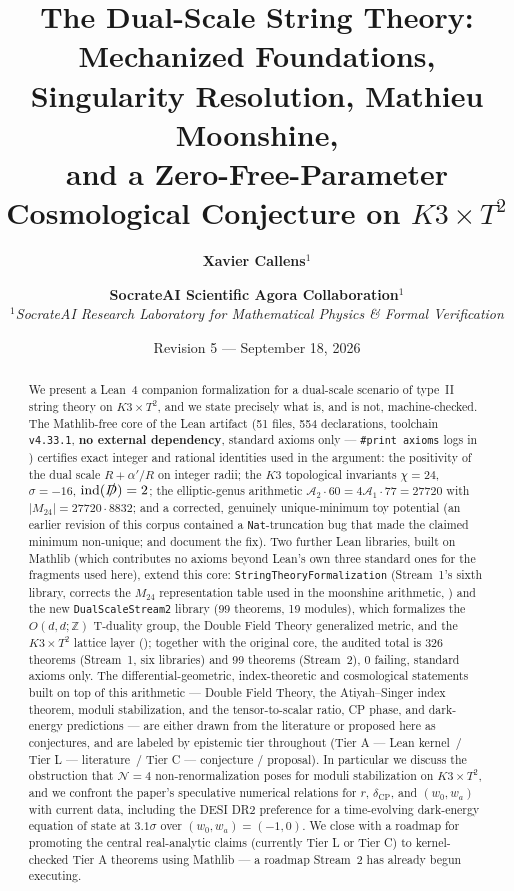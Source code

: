 \documentclass[11pt,a4paper]{article}
\title{\Huge \textbf{The Dual-Scale String Theory:}\\[0.3em]
\LARGE Mechanized Foundations, Singularity Resolution, Mathieu Moonshine,\\
and a Zero-Free-Parameter Cosmological Conjecture on $K3 \times T^2$}
\author{\textbf{Xavier Callens}$^{1}$ \and \textbf{SocrateAI Scientific Agora Collaboration}$^{1}$ \\[0.5em]
$^{1}$\textit{SocrateAI Research Laboratory for Mathematical Physics \& Formal Verification}}
\date{Revision 5 --- September 18, 2026}
\theoremstyle{remark}
\newcommand{\tierA}{\colorbox{green!15}{\textsf{\scriptsize Tier A --- Lean kernel}}}
\newcommand{\tierL}{\colorbox{blue!10}{\textsf{\scriptsize Tier L --- literature}}}
\newcommand{\tierC}{\colorbox{orange!15}{\textsf{\scriptsize Tier C --- conjecture / proposal}}}
\begin{document}
\maketitle

\begin{abstract}
We present a Lean~4 companion formalization for a dual-scale scenario of type~II string theory on
$K3\times T^2$, and we state precisely what is, and is not, machine-checked. The Mathlib-free core of
the Lean artifact (51 files, 554 declarations, toolchain \texttt{v4.33.1}, \textbf{no external
dependency}, standard axioms only --- \texttt{\#print axioms} logs in ) certifies
exact integer and rational identities used in the argument: the positivity of the dual scale
$R+\alpha'/R$ on integer radii; the $K3$ topological invariants $\chi=24$, $\sigma=-16$,
$\mathrm{ind}(\slashed D)=2$; the elliptic-genus arithmetic $\mathcal A_2\cdot 60 = 4\mathcal
A_1\cdot 77 = 27720$ with $|M_{24}| = 27720\cdot 8832$; and a corrected, genuinely unique-minimum toy
potential (an earlier revision of this corpus contained a \texttt{Nat}-truncation bug that made the
claimed minimum non-unique;  and  document the fix).
Two further Lean libraries, built on Mathlib (which contributes no axioms beyond Lean's own three
standard ones for the fragments used here), extend this core: \texttt{StringTheoryFormalization}
(Stream~1's sixth library, corrects the $M_{24}$ representation table used in the moonshine
arithmetic, ) and the new \texttt{DualScaleStream2} library (99 theorems, 19
modules), which formalizes the $O(d,d;\mathbb Z)$ T-duality group, the Double Field Theory
generalized metric, and the $K3\times T^2$ lattice layer (); together with the
original core, the audited total is 326 theorems (Stream~1, six libraries) and 99 theorems
(Stream~2), 0 failing, standard axioms only. The differential-geometric, index-theoretic and
cosmological statements built on top of this arithmetic --- Double Field Theory, the
Atiyah--Singer index theorem, moduli stabilization, and the tensor-to-scalar ratio, CP phase, and
dark-energy predictions --- are either drawn from the literature or proposed here as conjectures,
and are labeled by epistemic tier throughout (\tierA\ / \tierL\ / \tierC). In particular we discuss
the obstruction that $\mathcal{N}=4$ non-renormalization poses for moduli stabilization on $K3\times
T^2$, and we confront the paper's speculative numerical relations for $r$, $\delta_{\mathrm{CP}}$,
and $(w_0,w_a)$ with current data, including the DESI DR2 preference for a time-evolving dark-energy
equation of state at $3.1\sigma$ over $(w_0,w_a)=(-1,0)$. We close with a roadmap for promoting the
central real-analytic claims (currently Tier L or Tier C) to kernel-checked Tier A theorems using
Mathlib --- a roadmap Stream~2 has already begun executing.


\end{abstract}
\end{document}
